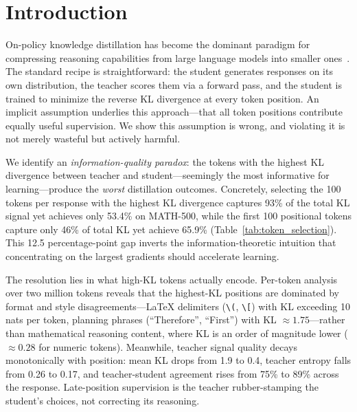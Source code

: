 
\section{Introduction}
\label{sec:intro}

On-policy knowledge distillation has become the dominant paradigm for compressing reasoning capabilities from large language models into smaller ones~\citep{agarwal2024gkd, gu2024minillm}.
The standard recipe is straightforward: the student generates responses on its own distribution, the teacher scores them via a forward pass, and the student is trained to minimize the reverse KL divergence at every token position.
An implicit assumption underlies this approach---that all token positions contribute equally useful supervision.
We show this assumption is wrong, and violating it is not merely wasteful but actively harmful.

We identify an \emph{information-quality paradox}: the tokens with the highest KL divergence between teacher and student---seemingly the most informative for learning---produce the \emph{worst} distillation outcomes.
Concretely, selecting the 100 tokens per response with the highest KL divergence captures 93\% of the total KL signal yet achieves only 53.4\% on MATH-500, while the first 100 positional tokens capture only 46\% of total KL yet achieve 65.9\% (Table~\ref{tab:token_selection}).
This 12.5 percentage-point gap inverts the information-theoretic intuition that concentrating on the largest gradients should accelerate learning.

The resolution lies in what high-KL tokens actually encode.
Per-token analysis over two million tokens reveals that the highest-KL positions are dominated by format and style disagreements---LaTeX delimiters (\texttt{\textbackslash(}, \texttt{\textbackslash[}) with KL exceeding 10 nats per token, planning phrases (``Therefore'', ``First'') with KL $\approx 1.75$---rather than mathematical reasoning content, where KL is an order of magnitude lower ($\approx 0.28$ for numeric tokens).
Meanwhile, teacher signal quality decays monotonically with position: mean KL drops from 1.9 to 0.4, teacher entropy falls from 0.26 to 0.17, and teacher-student agreement rises from 75\% to 89\% across the response.
Late-position supervision is the teacher rubber-stamping the student's choices, not correcting its reasoning.


